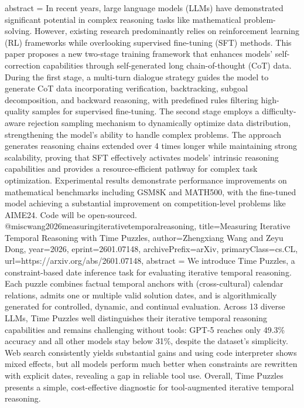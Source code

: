 {      abstract = {In recent years, large language models (LLMs) have demonstrated significant potential in complex reasoning tasks like mathematical problem-solving. However, existing research predominantly relies on reinforcement learning (RL) frameworks while overlooking supervised fine-tuning (SFT) methods. This paper proposes a new two-stage training framework that enhances models' self-correction capabilities through self-generated long chain-of-thought (CoT) data. During the first stage, a multi-turn dialogue strategy guides the model to generate CoT data incorporating verification, backtracking, subgoal decomposition, and backward reasoning, with predefined rules filtering high-quality samples for supervised fine-tuning. The second stage employs a difficulty-aware rejection sampling mechanism to dynamically optimize data distribution, strengthening the model's ability to handle complex problems. The approach generates reasoning chains extended over 4 times longer while maintaining strong scalability, proving that SFT effectively activates models' intrinsic reasoning capabilities and provides a resource-efficient pathway for complex task optimization. Experimental results demonstrate performance improvements on mathematical benchmarks including GSM8K and MATH500, with the fine-tuned model achieving a substantial improvement on competition-level problems like AIME24. Code will be open-sourced.}
}@misc{wang2026measuringiterativetemporalreasoning,
      title={Measuring Iterative Temporal Reasoning with Time Puzzles}, 
      author={Zhengxiang Wang and Zeyu Dong},
      year={2026},
      eprint={2601.07148},
      archivePrefix={arXiv},
      primaryClass={cs.CL},
      url={https://arxiv.org/abs/2601.07148},
      abstract = {We introduce Time Puzzles, a constraint-based date inference task for evaluating iterative temporal reasoning. Each puzzle combines factual temporal anchors with (cross-cultural) calendar relations, admits one or multiple valid solution dates, and is algorithmically generated for controlled, dynamic, and continual evaluation. Across 13 diverse LLMs, Time Puzzles well distinguishes their iterative temporal reasoning capabilities and remains challenging without tools: GPT-5 reaches only 49.3\% accuracy and all other models stay below 31\%, despite the dataset's simplicity. Web search consistently yields substantial gains and using code interpreter shows mixed effects, but all models perform much better when constraints are rewritten with explicit dates, revealing a gap in reliable tool use. Overall, Time Puzzles presents a simple, cost-effective diagnostic for tool-augmented iterative temporal reasoning.}
}
